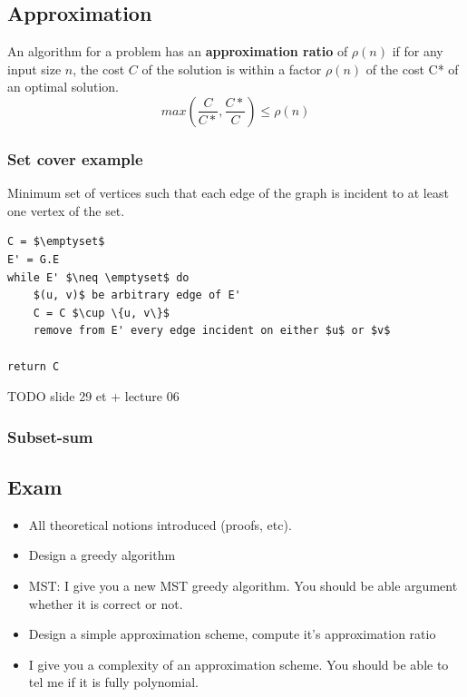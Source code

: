 \subsection{Approximation}

An algorithm for a problem has an \textbf{approximation ratio} of $\rho(n)$ if
for any input size $n$, the cost $C$ of the solution is within a factor
$\rho(n)$ of the cost C* of an optimal solution.
$$max(\frac{C}{C*}, \frac{C*}{C}) \leq \rho(n)$$

\subsubsection{Set cover example}
Minimum set of vertices such that each
edge of the graph is incident to at least one vertex of
the set.

\begin{lstlisting}[mathescape, caption=Greddy set cover]
C = $\emptyset$
E' = G.E
while E' $\neq \emptyset$ do
    $(u, v)$ be arbitrary edge of E'
    C = C $\cup \{u, v\}$
    remove from E' every edge incident on either $u$ or $v$

return C
\end{lstlisting}

TODO slide 29 et + lecture 06

\subsubsection{Subset-sum}

\subsection{Exam}
\begin{itemize}
    \item All theoretical notions introduced (proofs, etc).
    \item Design a greedy algorithm
    \item MST: I give you a new MST greedy algorithm. You
        should be able argument whether it is correct or not.
    \item Design a simple approximation scheme, compute it’s
        approximation ratio
    \item I give you a complexity of an approximation scheme.
        You should be able to tel me if it is fully polynomial.
\end{itemize}
